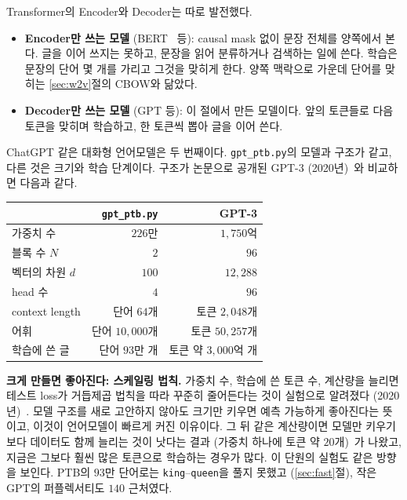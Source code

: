 \documentclass[11pt,a4paper]{article}
\newcommand{\w}[1]{\texttt{#1}}
\begin{document}
Transformer의 Encoder와 Decoder는 따로 발전했다.
\begin{itemize}[leftmargin=1.5em]
\item \textbf{Encoder만 쓰는 모델} (BERT~\cite{devlin2019} 등): causal mask 없이 문장 전체를 양쪽에서 본다. 글을 이어 쓰지는 못하고, 문장을 읽어 분류하거나 검색하는 일에 쓴다.
학습은 문장의 단어 몇 개를 가리고 그것을 맞히게 한다. 양쪽 맥락으로 가운데 단어를 맞히는 \ref{sec:w2v}절의 CBOW와 닮았다.
\item \textbf{Decoder만 쓰는 모델} (GPT 등): 이 절에서 만든 모델이다. 앞의 토큰들로 다음 토큰을 맞히며 학습하고, 한 토큰씩 뽑아 글을 이어 쓴다.
\end{itemize}

ChatGPT 같은 대화형 언어모델은 두 번째이다. \texttt{gpt\_ptb.py}의 모델과 구조가 같고, 다른 것은 크기와 학습 단계이다.
구조가 논문으로 공개된 GPT-3 (2020년)~\cite{brown2020}와 비교하면 다음과 같다.

\begin{center}
\begin{tabular}{@{}lrr@{}}
\toprule
& \texttt{gpt\_ptb.py} & GPT-3 \\
\midrule
가중치 수 & $226$만 & $1{,}750$억 \\
블록 수 $N$ & $2$ & $96$ \\
벡터의 차원 $d$ & $100$ & $12{,}288$ \\
head 수 & $4$ & $96$ \\
context length & 단어 $64$개 & 토큰 $2{,}048$개 \\
어휘 & 단어 $10{,}000$개 & 토큰 $50{,}257$개 \\
학습에 쓴 글 & 단어 $93$만 개 & 토큰 약 $3{,}000$억 개 \\
\bottomrule
\end{tabular}
\end{center}

\textbf{크게 만들면 좋아진다: 스케일링 법칙.} 가중치 수, 학습에 쓴 토큰 수, 계산량을 늘리면 테스트 loss가 거듭제곱 법칙을 따라 꾸준히 줄어든다는 것이 실험으로 알려졌다 (2020년)~\cite{kaplan2020}.
모델 구조를 새로 고안하지 않아도 크기만 키우면 예측 가능하게 좋아진다는 뜻이고, 이것이 언어모델이 빠르게 커진 이유이다.
그 뒤 같은 계산량이면 모델만 키우기보다 데이터도 함께 늘리는 것이 낫다는 결과 (가중치 하나에 토큰 약 $20$개)~\cite{hoffmann2022}가 나왔고, 지금은 그보다 훨씬 많은 토큰으로 학습하는 경우가 많다.
이 단원의 실험도 같은 방향을 보인다. PTB의 $93$만 단어로는 \w{king}--\w{queen}을 풀지 못했고 (\ref{sec:fast}절), 작은 GPT의 퍼플렉서티도 $140$ 근처였다.
\end{document}
